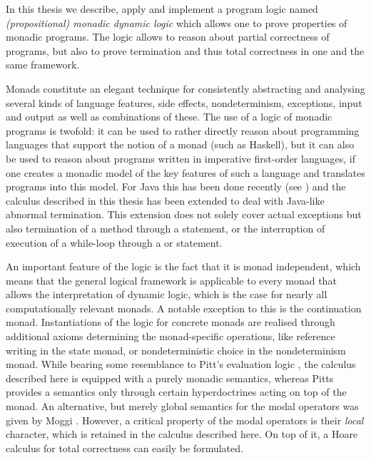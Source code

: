 In this thesis we describe, apply and implement a program logic named
\emph{(propositional) monadic dynamic logic} \cite{SchroederMossakowski:PDL}
which allows one to prove properties of monadic programs.   The
logic allows to reason about partial correctness of programs, but also to prove
termination and thus total correctness in one and the same framework.

Monads constitute an elegant technique for consistently abstracting and
analysing several kinds of language features, \EG side effects, nondeterminism,
exceptions, input and output as well as combinations of these. The use of a
logic of monadic programs is twofold: it can be used to rather directly reason
about programming languages that support the notion of a monad (such as
Haskell), but it can also be used to reason about programs written in imperative
first-order languages, if one creates a monadic model of the key features of
such a language and translates programs into this model. For Java this has been
done recently (see \cite{HuismanJacobs00}) and the calculus described in this
thesis has been extended to deal with Java-like abnormal termination. This
extension does not solely cover actual exceptions but also termination of a
method through a  statement, or the interruption of execution of a
while-loop through a  or  statement.

An important feature of the logic is the fact that it is monad independent,
which means that the general logical framework is applicable to every monad that
allows the interpretation of dynamic logic, which is the case for nearly all
computationally relevant monads. A notable exception to this is the continuation
monad. Instantiations of the logic for concrete monads are realised through
additional axioms determining the monad-specific operations, like reference
writing in the state monad, or nondeterministic choice in the nondeterminism
monad.  While bearing some resemblance to Pitt's evaluation logic
\cite{Pitts91}, the calculus described here is equipped with a purely monadic
semantics, whereas Pitts provides a semantics only through certain
hyperdoctrines acting on top of the monad. An alternative, but merely global
semantics for the modal operators was given by Moggi \cite{Moggi95}. However, a
critical property of the modal operators is their \emph{local} character, which
is retained in the calculus described here. On top of it, a Hoare calculus for
total correctness can easily be formulated.



